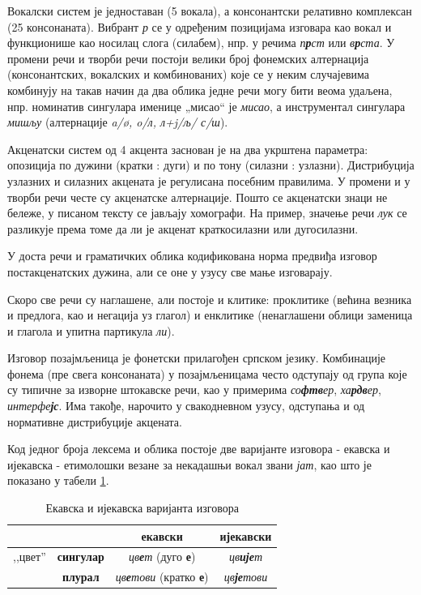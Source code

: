 \begin{multicols}{2}
Вокалски систем је једноставан (5 вокала), а консонантски релативно комплексан (25 консонаната). Вибрант \textit{р} се у одређеним позицијама изговара као вокал и функционише као носилац слога (силабем), нпр. у речима \textit{п\textbf{р}ст} или \textit{в\textbf{р}ста}. У промени речи и творби речи постоји велики број фонемских алтернација (консонантских, вокалских и комбинованих) које се у неким случајевима комбинују на такав начин да два облика једне речи могу бити веома удаљена, нпр. номинатив сингулара именице „мисао“ је \textit{мисао}, а инструментал сингулара \textit{мишљу} (алтернације \textit{a/\o{}, o/л, л+j/љ/ с/ш}).

Акценатски систем од 4 акцента заснован је на два укрштена параметра: опозиција по дужини  (кратки : дуги) и по тону (силазни : узлазни).  Дистрибуција узлазних и силазних акцената је регулисана посебним правилима. У промени и у творби речи честе су акценатске алтернације. Пошто се акценатски знаци не бележе, у писаном тексту се јављају хомографи. На пример, значење речи \textit{лук} се разликује према томе да ли је акценат краткосилазни или дугосилазни.

У доста речи и граматичких облика кодификована норма предвиђа изговор постакценатских дужина, али се оне у узусу све мање изговарају.

Скоро све речи су наглашене, али постоје и клитике: проклитике (већина везника и предлога, као и негација уз глагол) и енклитике (ненаглашени облици заменица и глагола и упитна партикула \textit{ли}).

Изговор позајмљеница је фонетски прилагођен српском језику. Комбинације фонема (пре свега консонаната) у позајмљеницама често одступају од група које су типичне за изворне штокавске речи, као у примерима \textit{со\textbf{фтв}ер}, \textit{ха\textbf{рдв}ер}, \textit{интерфе\textbf{јс}}. Има такође, нарочито у свакодневном узусу, одступања и од нормативне дис\-три\-бу\-ци\-је акцената.

Код једног броја лексема и облика постоје две варијанте изговора - екавска и ијекавска - етимолошки везане за некадашњи вокал звани \textit{јат}, као што је показано у табели \ref{ekavski_ijekavski}. 


\begin{table}[ht]
\begin{center}
\begin{tabular}{|c|c|c|c|}
 \hline
  \multicolumn{2}{|c|}{} & {\textbf{екавски}} & {\textbf{ијекавски}} \\ 
   \hline
  {,,цвет''} & {\textbf{сингулар}} & \textit{цв\textbf{е}т} (дуго \textbf{е}) & \textit{цв\textbf{ије}т}\\ 
   \cline{2-4}
     & {\textbf{плурал}} & \textit{цв\textbf{е}тови} (кратко \textbf{е}) & \textit{цв\textbf{је}тови} \\
  \hline
 \end{tabular}
\end{center}
\caption{Екавска и ијекавска варијанта изговора}
\label{ekavski_ijekavski}
\end{table}


\end{multicols}

